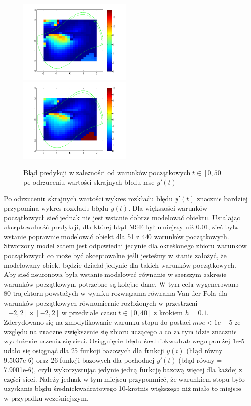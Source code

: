 \begin{figure}[ht!]
	\centering

	\subfloat
	{\includegraphics[width=0.5\textwidth]
	{images/figure_signal.png}}
	\subfloat
	{\includegraphics[width=0.5\textwidth]
	{images/figure_deriv_new.png}}	
	

	\caption{Błąd predykcji w zależności od warunków początkowych $t \in [0,50]$ po odrzuceniu wartości skrajnych błedu mse $y'(t)$}
	\label{img:err_initial_new}
\end{figure}

Po odrzuceniu skrajnych wartości wykres rozkładu błędu $y'(t)$ znacznie bardziej przypomina wykres rozkładu błędu $y(t)$. Dla większości warunków początkowych sieć jednak nie jest wstanie dobrze modelować obiektu. Ustalając akceptowalność predykcji, dla której błąd MSE był mniejszy niż 0.01, sieć była wstanie poprawnie modelować obiekt dla 51 z 440 warunków początkowych. Stworzony model zatem jest odpowiedni jedynie dla określonego zbioru warunków początkowych co może być akceptowalne jeśli jesteśmy w stanie założyć, że modelowany obiekt będzie działał jedynie dla takich warunków początkowych. Aby sieć neuronowa była wstanie modelować równanie w szerszym zakresie warunków początkowym potrzebne są kolejne dane. W tym celu wygenerowano 80 trajektorii powstałych w wyniku rozwiązania równania Van der Pola dla warunków początkowych równomiernie rozłożonych w przestrzeni $[-2,2] \times [-2,2]$ w przedziale czasu $t \in [0, 40]$ z krokiem $h=0.1$. Zdecydowano się na zmodyfikowanie warunku stopu do postaci $mse < 1e-5$ ze względu na znaczne zwiększenie się zbioru uczącego a co za tym idzie znacznie wydłużenie uczenia się sieci.
Osiągnięcie błędu średniokwadratowego poniżej 1e-5 udało się osiągnąć dla 25 funkcji bazowych dla funkcji $y(t)$ (błąd równy = 9.5037e-6) oraz 26 funkcji bazowych dla pochodnej $y'(t)$ (błąd równy = 7.9001e-6), czyli wykorzystując jedynie jedną funkcję bazową więcej dla każdej z części sieci. Należy jednak w tym miejscu przypomnieć, że warunkiem stopu było uzyskanie błędu średniokwadratowego 10-krotnie większego niż miało to miejsce w przypadku wcześniejszym. 

